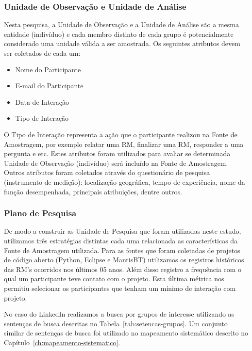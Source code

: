 \subsubsection{Unidade de Observação e Unidade de Análise}

Nesta pesquisa, a Unidade de Observação e a Unidade de Análise são a mesma
entidade (indivíduo) e cada membro distinto de cada grupo é potencialmente
considerado uma unidade válida a ser amostrada. Os seguintes atributos devem ser
coletados de cada um:
\begin{itemize}
	\item Nome do Participante
	\item E-mail do Participante
	\item Data de Interação
	\item Tipo de Interação
\end{itemize}

O Tipo de Interação representa a ação que o participante realizou na Fonte de
Amostragem, por exemplo relatar uma RM, finalizar uma RM, responder a uma
pergunta e etc. Estes atributos foram utilizados para avaliar se determinada
Unidade de Observação (indivíduo) será incluído na Fonte de Amostragem. Outros
atributos foram coletados através do questionário de pesquisa (instrumento de
medição): localização geográfica, tempo de experiência, nome da função
desempenhada, principais atribuições, dentre outros.

\subsubsection{Plano de Pesquisa}

De modo a construir as Unidade de Pesquisa que foram utilizadas neste estudo,
utilizamos três estratégias distintas cada uma relacionada as características da
Fonte de Amostragem utilizada. Para as fontes que foram coletadas de projetos de
código aberto (Python, Eclipse e MantisBT) utilizamos os registros históricos
das RM's ocorridos nos últimos 05 anos. Além disso registro a frequência com o
qual um participante teve contato com o projeto. Esta última métrica nos
permitiu selecionar os participantes que tenham um mínimo de interação com
projeto. 

No caso do LinkedIn realizamos a busca por grupos de interesse utilizando as
sentenças de busca descritas no Tabela~\ref{tab:setencas-grupos}. Um conjunto
similar de sentenças de busca foi utilizado no mapeamento sistemático  descrito
no Capítulo~\ref{ch:mapeamento-sistematico}.

